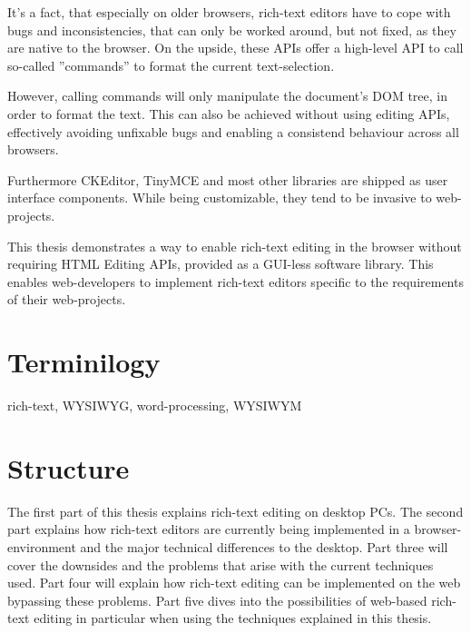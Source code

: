 It's a fact, that especially on older browsers, rich-text editors have to cope with bugs and inconsistencies, that can only be worked around, but not fixed, as they are native to the browser. On the upside, these APIs offer a high-level API to call so-called ''commands'' to format the current text-selection. 

However, calling commands will only manipulate the document's DOM tree, in order to format the text. This can also be achieved without using editing APIs, effectively avoiding unfixable bugs and enabling a consistend behaviour across all browsers.

Furthermore CKEditor, TinyMCE and most other libraries are shipped as user interface components. While being customizable, they tend to be invasive to web-projects.

This thesis demonstrates a way to enable rich-text editing in the browser without requiring HTML Editing APIs, provided as a GUI-less software library. This enables web-developers to implement rich-text editors specific to the requirements of their web-projects.

\section{Terminilogy}

rich-text, WYSIWYG, word-processing, WYSIWYM

\section{Structure}

The first part of this thesis explains rich-text editing on desktop PCs. The second part explains how rich-text editors are currently being implemented in a browser-environment and the major technical differences to the desktop. Part three will cover the downsides and the problems that arise with the current techniques used. Part four will explain how rich-text editing can be implemented on the web bypassing these problems. Part five dives into the possibilities of web-based rich-text editing in particular when using the techniques explained in this thesis.


